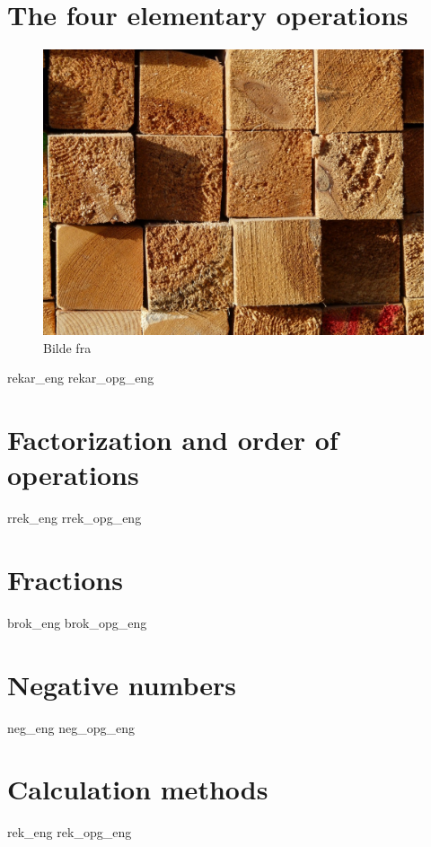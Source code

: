 \chapter{The four elementary operations \label{Rekneartane}}
\begin{figure}
	\centering
	\includegraphics[scale=0.38]{wood} \\
	{\footnotesize Bilde fra } 
\end{figure}
\newpage
{rekar_eng}
{rekar_opg_eng}

\chapter{Factorization and order of operations}
\newpage
{rrek_eng}
{rrek_opg_eng}

\chapter{Fractions}
\newpage
{brok_eng}
{brok_opg_eng}

\chapter{Negative numbers \label{Negtal}}
\newpage
{neg_eng}
{neg_opg_eng}

\chapter{Calculation methods} \label{Rekneartane}
\newpage
{rek_eng}
{rek_opg_eng}

